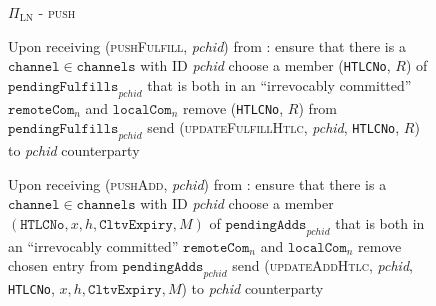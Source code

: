   \begin{figure}[H]
    \begin{protocolbox}{$\Pi_{\mathrm{LN}}$ - \textsc{push}}
      \begin{algorithmic}[1]
        \State Upon receiving (\textsc{pushFulfill}, \textit{pchid}) from
        \environment:
        \Indent
          \State ensure that there is a $\mathtt{channel} \in \mathtt{channels}$
          with ID \textit{pchid}
          \State choose a member (\texttt{HTLCNo}, $R$) of
          $\mathtt{pendingFulfills}_{\mathit{pchid}}$ that is both in an
          ``irrevocably committed'' $\mathtt{remoteCom}_n$ and
          $\mathtt{localCom}_n$
          \State remove (\texttt{HTLCNo}, $R$) from
          $\mathtt{pendingFulfills}_{\mathit{pchid}}$
          \State send (\textsc{updateFulfillHtlc}, \textit{pchid},
          \texttt{HTLCNo}, $R$) to \textit{pchid} counterparty
        \EndIndent
        \Statex

        \State Upon receiving (\textsc{pushAdd}, \textit{pchid}) from
        \environment:
        \Indent
          \State ensure that there is a $\mathtt{channel} \in \mathtt{channels}$
          with ID \textit{pchid}
          \State choose a member $\left(\mathtt{HTLCNo}, x, h,
          \mathtt{CltvExpiry}, M\right)$ of
          $\mathtt{pendingAdds}_{\mathit{pchid}}$ that is both in an
          ``irrevocably committed'' $\mathtt{remoteCom}_n$ and
          $\mathtt{localCom}_n$
          \State remove chosen entry from
          $\mathtt{pendingAdds}_{\mathit{pchid}}$
          \State send (\textsc{updateAddHtlc}, \textit{pchid}, \texttt{HTLCNo},
          $x, h, \mathtt{CltvExpiry}, M$) to \textit{pchid} counterparty
        \EndIndent
      \end{algorithmic}
    \end{protocolbox}
    \caption{}
    \label{alg:protocol:pay:push}
  \end{figure}

